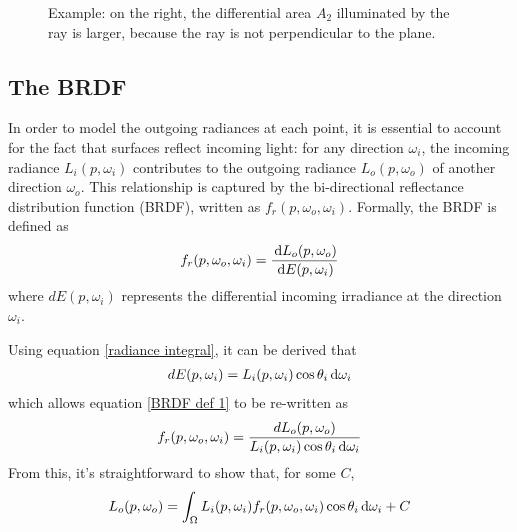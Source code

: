 \begin{figure}[H]
    

\caption{Example: on the right, the differential area $A_2$ illuminated by the ray is larger, because the ray is not perpendicular to the plane.}    
\end{figure}


\subsection{The BRDF}

In order to model the outgoing radiances at each point, it is essential to account for the fact that surfaces reflect incoming light: for any direction $\omega_i$, the incoming radiance $L_i(p,\omega_i)$ contributes to the outgoing radiance $L_o(p,\omega_o)$ of another direction $\omega_o$. This relationship is captured by the bi-directional reflectance distribution function (BRDF), written as $f_r(p,\omega_o,\omega_i)$. Formally, the BRDF is defined as 
\begin{align}
    f_r(p,\omega_o,\omega_i) = \frac{\,\mathrm{d} L_o(p,\omega_o)}{\,\mathrm{d} E(p,\omega_i)}
    \label{BRDF def 1}
\end{align}
where $dE(p,\omega_i)$ represents the differential incoming irradiance at the direction $\omega_i$.

Using equation \ref{radiance integral}, it can be derived that 
\begin{align}
    dE(p,\omega_i) = L_i(p,\omega_i)\cos\theta_i\,\mathrm{d}\omega_i
\end{align}
which allows equation \ref{BRDF def 1} to be re-written as
\begin{align}
    f_r(p,\omega_o,\omega_i) = \frac{dL_o(p,\omega_o)}{L_i(p,\omega_i)\cos\theta_i\,\mathrm{d}\omega_i}
\end{align}
From this, it's straightforward to show that, for some $C$,
\begin{align}
    L_o(p,\omega_o) = \int_\Omega L_i(p,\omega_i)f_r(p,\omega_o,\omega_i)\cos\theta_i\,\mathrm{d}\omega_i + C
    \label{reflection plus C}
\end{align}

